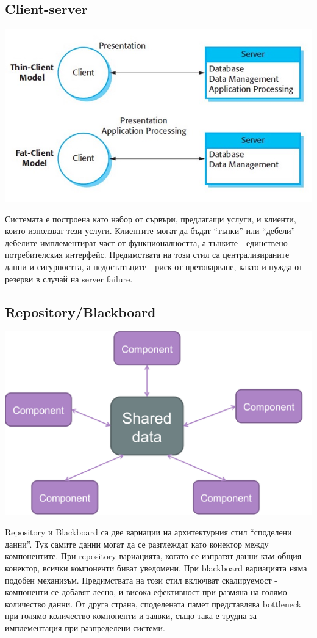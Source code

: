 \documentclass[fleqn,12pt]{article}
\begin{document}
\subsection{Client-server}
\includegraphics[width=175mm]{client_server.jpg}

Системата е построена като набор от сървъри, предлагащи услуги, и клиенти, които използват тези услуги. Клиентите могат да бъдат “тънки” или “дебели” - дебелите имплементират част от функционалността, а тънките - единствено потребителския интерфейс. Предимствата на този стил са централизираните данни и сигурността, а недостатъците - риск от претоварване, както и нужда от резерви в случай на server failure.

\subsection{Repository/Blackboard}
\includegraphics[width=175mm]{shared_memory.png}

Repository и Blackboard са две вариации на архитектурния стил “споделени данни”. Тук самите данни могат да се разглеждат като конектор между компонентите.
При repository вариацията, когато се изпратят данни към общия конектор, всички компоненти биват уведомени. При blackboard вариацията няма подобен механизъм.
Предимствата на този стил включват скалируемост - компоненти се добавят лесно, и висока ефективност при размяна на голямо количество данни. От друга страна, споделената памет представлява bottleneck при голямо количество компоненти и заявки, също така е трудна за имплементация при разпределени системи.
\end{document}
